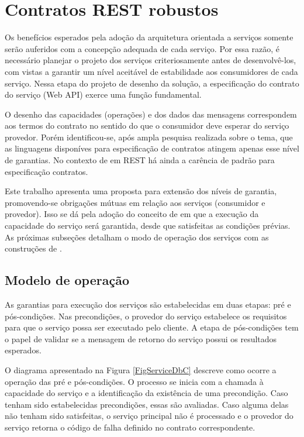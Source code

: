 \section{Contratos REST robustos}
 
 
Os benefícios esperados pela adoção da arquitetura orientada a serviços
somente serão auferidos com a concepção adequada de cada serviço. 
Por essa razão, é necessário planejar o projeto dos serviços criteriosamente
antes de desenvolvê-los, com vistas a garantir
um nível aceitável de estabilidade aos consumidores de cada serviço.
Nessa etapa do projeto de desenho da solução, a especificação do contrato do
serviço (Web API) exerce uma função fundamental.  

O desenho das
capacidades (operações) e dos dados das mensagens correspondem aos
termos do contrato no sentido do que o consumidor deve esperar do serviço
provedor. Porém identificou-se, após ampla pesquisa realizada sobre o tema, que
as linguagens disponíves para especificação de contratos atingem apenas esse
nível de garantias. No contexto de \wss{} em REST há ainda a carência de padrão
para especificação contratos.

Este trabalho apresenta uma proposta para extensão dos níveis de garantia, 
promovendo-se obrigações mútuas em relação aos serviços (consumidor e
provedor). Isso se dá pela adoção do conceito de \designbycontract{} em que a execução da 
capacidade do serviço será garantida, desde que satisfeitas as condições prévias. As próximas subseções 
detalham o modo de operação dos serviços com as construções de \designbycontract{}.

\subsection{Modelo de operação}


As garantias para execução dos serviços são estabelecidas em duas etapas: pré e
pós-condições. Nas precondições, o provedor do serviço estabelece os requisitos
para que o serviço possa ser executado pelo cliente. A etapa de pós-condições
tem o papel de validar se a mensagem de retorno do serviço possui os resultados
esperados.

O diagrama apresentado na Figura \ref{FigServiceDbC} descreve como ocorre a
operação das pré e pós-condições. O processo se inicia com a chamada à capacidade do serviço e a
identificação da existência de uma precondição. Caso tenham sido estabelecidas 
precondições, essas são avaliadas. Caso alguma delas não tenham sido
satisfeitas, o serviço principal não é processado e o provedor do serviço
retorna o código de falha definido no contrato correspondente.


